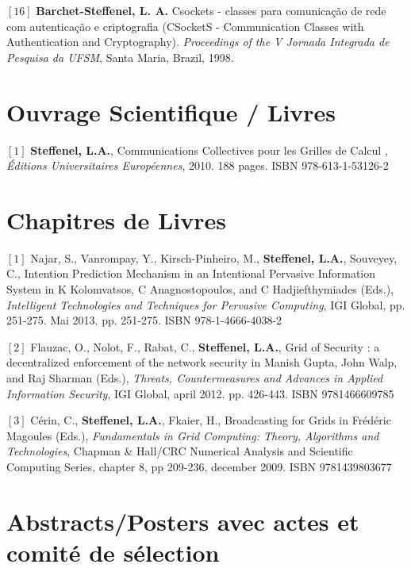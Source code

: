 \documentclass[final,twoside]{hdr} %
\begin{document}
\vspace{1em} \noindent $[16]$
\textbf{Barchet-Steffenel, L. A.} {Csockets - classes para comunicação de rede com autenticação e criptografia} (CSocketS - Communication Classes with Authentication and Cryptography). {\em Proceedings of the V Jornada Integrada de Pesquisa da UFSM}, Santa Maria, Brazil, 1998.

\section*{Ouvrage Scientifique / Livres}

\noindent $[1]$
\textbf{Steffenel, L.A.}, {Communications Collectives pour les Grilles de Calcul} , {\em Éditions Universitaires Européennes}, 2010. 188 pages. ISBN 978-613-1-53126-2

\section*{Chapitres de Livres}

\noindent $[1]$
Najar, S., Vanrompay, Y., Kirsch-Pinheiro, M., \textbf{Steffenel, L.A.}, Souveyey, C., {Intention Prediction Mechanism in an Intentional Pervasive Information System} in K Kolomvatsos, C Anagnostopoulos, and C Hadjiefthymiades (Eds.), {\em Intelligent Technologies and Techniques for Pervasive Computing}, IGI Global, pp. 251-275. Mai 2013. pp. 251-275. ISBN 978-1-4666-4038-2

\vspace{1em} \noindent $[2]$
Flauzac, O., Nolot, F., Rabat, C., \textbf{Steffenel, L.A.}, {Grid of Security : a decentralized enforcement of the network security} in Manish Gupta, John Walp, and Raj Sharman (Eds.), {\em Threats, Countermeasures and Advances in Applied Information Security}, IGI Global, april 2012. pp. 426-443. ISBN 9781466609785

\vspace{1em} \noindent $[3]$
Cérin, C., \textbf{Steffenel, L.A.}, Fkaier, H., {Broadcasting for Grids} in Frédéric Magoules (Eds.), {\em Fundamentals in Grid Computing: Theory, Algorithms and Technologies}, Chapman \& Hall/CRC Numerical Analysis and Scientific Computing Series, chapter 8, pp 209-236, december 2009. ISBN 9781439803677

\section*{Abstracts/Posters avec actes et comité de sélection}
\end{document}
